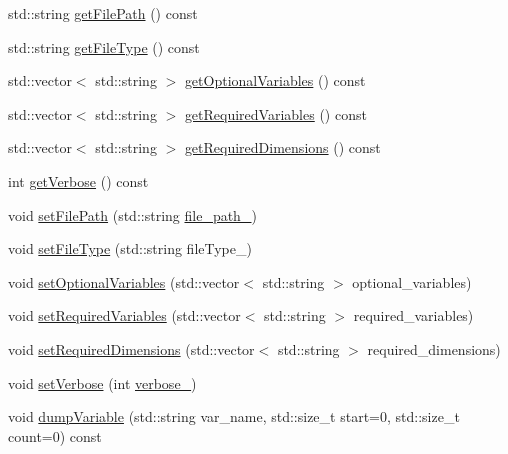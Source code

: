 \begin{DoxyCompactItemize}
\item 
std\+::string \mbox{\hyperlink{class_an_en_i_o_aae00624f6127c7946496443f5322ec8e}{get\+File\+Path}} () const
\item 
std\+::string \mbox{\hyperlink{class_an_en_i_o_a6f51b190d64895a4ad907abcf4a10b75}{get\+File\+Type}} () const
\item 
std\+::vector$<$ std\+::string $>$ \mbox{\hyperlink{class_an_en_i_o_a50997e1baef5b8bb18d833c8c875a7bc}{get\+Optional\+Variables}} () const
\item 
std\+::vector$<$ std\+::string $>$ \mbox{\hyperlink{class_an_en_i_o_abd3cbf0e384dd9d610f985fb4131df9b}{get\+Required\+Variables}} () const
\item 
std\+::vector$<$ std\+::string $>$ \mbox{\hyperlink{class_an_en_i_o_ace777827f2548b3f06ce13f3ce4f4b6b}{get\+Required\+Dimensions}} () const
\item 
int \mbox{\hyperlink{class_an_en_i_o_a0bf0dab5e393c5597f97ab38c910e24d}{get\+Verbose}} () const
\item 
void \mbox{\hyperlink{class_an_en_i_o_a38bdc2d686737eba3812b3b41e073006}{set\+File\+Path}} (std\+::string \mbox{\hyperlink{class_an_en_i_o_ab892e06ca18be5e0c442c9e882e4475f}{file\+\_\+path\+\_\+}})
\item 
void \mbox{\hyperlink{class_an_en_i_o_ac1a951fd63d9b109e4574143e077f9b2}{set\+File\+Type}} (std\+::string file\+Type\+\_\+)
\item 
void \mbox{\hyperlink{class_an_en_i_o_abc499df15eac5fa3f203267723f5edfa}{set\+Optional\+Variables}} (std\+::vector$<$ std\+::string $>$ optional\+\_\+variables)
\item 
void \mbox{\hyperlink{class_an_en_i_o_a643c51c346118d8416fa2c2e0da8042a}{set\+Required\+Variables}} (std\+::vector$<$ std\+::string $>$ required\+\_\+variables)
\item 
void \mbox{\hyperlink{class_an_en_i_o_a239ea94b3648006920bcdcded4040ad3}{set\+Required\+Dimensions}} (std\+::vector$<$ std\+::string $>$ required\+\_\+dimensions)
\item 
void \mbox{\hyperlink{class_an_en_i_o_a696dff7bb250fc45b597e5f82e33e23e}{set\+Verbose}} (int \mbox{\hyperlink{class_an_en_i_o_a4f6abd007730e4a8f54d57cc3572bd9e}{verbose\+\_\+}})
\item 
void \mbox{\hyperlink{class_an_en_i_o_acd5682e81361d75ff5566ae1df5fa023}{dump\+Variable}} (std\+::string var\+\_\+name, std\+::size\+\_\+t start=0, std\+::size\+\_\+t count=0) const
\end{DoxyCompactItemize}

